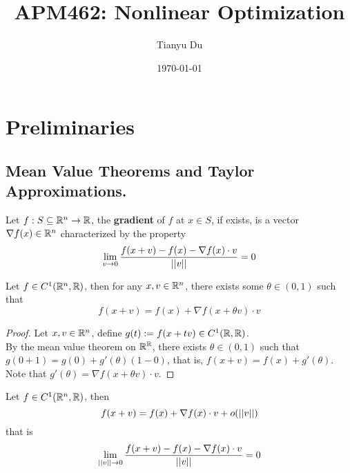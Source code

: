 \documentclass{article}
\title{APM462: Nonlinear Optimization}
\date{\today}
\author{Tianyu Du}
\begin{document}
    \maketitle
    \tableofcontents
    \newpage
    
    \section{Preliminaries}
    \subsection{Mean Value Theorems and Taylor Approximations.}
    \begin{definition}
        Let $f: S \subseteq \mathbb{R}^n \to \mathbb{R}$, the \textbf{gradient} of $f$ at $x \in S$, if exists, is a vector $\nabla f(x) \in \mathbb{R}^n$ characterized by the property
        \begin{equation}
            \lim_{v \to 0} \frac{f(x+v) - f(x) - \nabla f(x) \cdot v}{\vert \vert {v} \vert \vert} = 0
        \end{equation}
    \end{definition}
    
    \begin{theorem}
        Let $f \in C^1(\mathbb{R}^n, \mathbb{R})$, then for any $x, v \in \mathbb{R}^n$, there exists some $\theta \in (0, 1)$ such that
        \begin{equation}
            f(x + v) = f(x) + \nabla f(x + \theta v) \cdot v
        \end{equation}
    \end{theorem}
    
    \begin{proof}
        Let $x, v \in \mathbb{R}^n$, define $g(t) := f(x + tv) \in C^1(\mathbb{R}, \mathbb{R})$. \\
        By the mean value theorem on $\mathbb{R}^{\mathbb{R}}$, there exists $\theta \in (0, 1)$ such that $g(0+1) = g(0) + g'(\theta)(1-0)$, that is, $f(x+v) = f(x) + g'(\theta)$. Note that $g'(\theta) = \nabla f(x + \theta v) \cdot v$.
    \end{proof}
    
    \begin{proposition}
        Let $f \in C^1(\mathbb{R}^n, \mathbb{R})$, then
        \begin{equation}
            f(x + v) = f(x) + \nabla f(x) \cdot v + o(\vert \vert {v} \vert \vert)
        \end{equation}
        that is
        \begin{equation}
            \lim_{\vert \vert {v} \vert \vert \to 0} \frac{f(x + v) - f(x) - \nabla f(x) \cdot v}{\vert \vert {v} \vert \vert} = 0
        \end{equation}
    \end{proposition}
    
\end{document}
